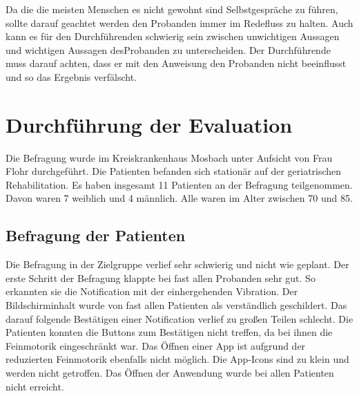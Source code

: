 Da die die meisten Menschen es nicht gewohnt sind Selbstgespräche zu führen, sollte darauf geachtet werden den Probanden immer im Redefluss zu halten. Auch kann es für den Durchführenden schwierig sein zwischen unwichtigen Aussagen und wichtigen Aussagen desProbanden zu unterscheiden. Der Durchführende muss darauf achten, dass er mit den Anweisung den Probanden nicht beeinflusst und so das Ergebnis verfälscht.

\section{Durchführung der Evaluation}
Die Befragung wurde im Kreiskrankenhaus Mosbach unter Aufsicht von Frau Flohr durchgeführt. Die Patienten befanden sich stationär auf der geriatrischen Rehabilitation. Es haben insgesamt 11 Patienten  an der Befragung teilgenommen. Davon waren 7 weiblich und 4 männlich. Alle waren im Alter zwischen 70 und 85. 

\subsection{Befragung der Patienten}

Die Befragung in der Zielgruppe verlief sehr schwierig und nicht wie geplant.
Der erste Schritt der Befragung klappte bei fast allen Probanden sehr gut. So erkannten sie die Notification mit der einhergehenden Vibration. Der Bildschirminhalt wurde von fast allen Patienten als verständlich geschildert. Das darauf folgende Bestätigen einer Notification verlief zu großen Teilen schlecht. Die Patienten konnten die Buttons zum Bestätigen nicht treffen, da bei ihnen die Feinmotorik eingeschränkt war.
Das Öffnen einer App ist aufgrund der reduzierten Feinmotorik ebenfalls nicht möglich. Die App-Icons sind zu klein und werden nicht getroffen. Das Öffnen der Anwendung wurde bei allen Patienten nicht erreicht.
